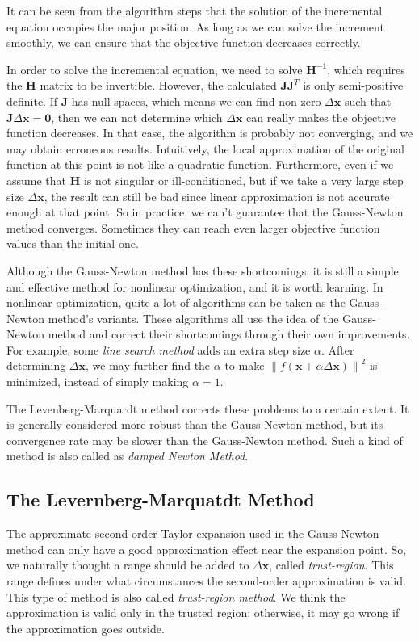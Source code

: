 It can be seen from the algorithm steps that the solution of the incremental equation occupies the major position. As long as we can solve the increment smoothly, we can ensure that the objective function decreases correctly.

In order to solve the incremental equation, we need to solve $\mathbf{H}^{-1}$, which requires the $\mathbf{H}$ matrix to be invertible. However, the calculated $\mathbf{J} \mathbf{ J}^T$ is only semi-positive definite. If $\mathbf{J}$ has null-spaces, which means we can find non-zero $\Delta \mathbf{x}$ such that $\mathbf{J} \Delta\mathbf{x} = \mathbf{0}$, then we can not determine which $\Delta \mathbf{x}$ can really makes the objective function decreases. In that case, the algorithm is probably not converging, and we may obtain erroneous results. Intuitively, the local approximation of the original function at this point is not like a quadratic function. Furthermore, even if we assume that $\mathbf{H}$ is not singular or ill-conditioned, but if we take a very large step size $\Delta \mathbf{x}$, the result can still be bad since linear approximation is not accurate enough at that point. So in practice, we can't guarantee that the Gauss-Newton method converges. Sometimes they can reach even larger objective function values than the initial one. 

Although the Gauss-Newton method has these shortcomings, it is still a simple and effective method for nonlinear optimization, and it is worth learning. In nonlinear optimization, quite a lot of algorithms can be taken as the Gauss-Newton method's variants. These algorithms all use the idea of the Gauss-Newton method and correct their shortcomings through their own improvements. For example, some \textit{line search method} adds an extra step size $\alpha$. After determining $\Delta \mathbf{x}$, we may further find the $\alpha$ to make $\left\| f (\mathbf{x} + \alpha \Delta \mathbf{ x}) \right\|^2$ is minimized, instead of simply making $\alpha = 1$.

The Levenberg-Marquardt method corrects these problems to a certain extent. It is generally considered more robust than the Gauss-Newton method, but its convergence rate may be slower than the Gauss-Newton method. Such a kind of method is also called as \textit{damped Newton Method}.

\subsection{The Levernberg-Marquatdt Method}
The approximate second-order Taylor expansion used in the Gauss-Newton method can only have a good approximation effect near the expansion point. So, we naturally thought a range should be added to $\Delta \mathbf{x}$, called \textit{trust-region}. This range defines under what circumstances the second-order approximation is valid. This type of method is also called \textit{trust-region method}. We think the approximation is valid only in the trusted region; otherwise, it may go wrong if the approximation goes outside.

